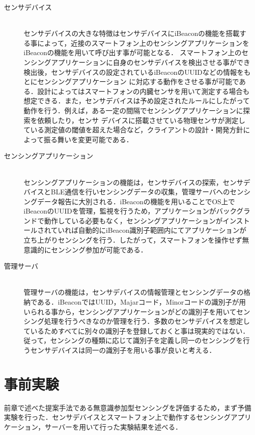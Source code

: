 \documentclass[submit,techrep]{ipsj}
\begin{document}
\begin{description}
 \item[センサデバイス]\mbox{}\\
      センサデバイスの大きな特徴はセンサデバイスにiBeaconの機能を搭載する事によって，近接のスマートフォン上のセンシングアプリケーションをiBeaconの機能を用いて呼び出す事が可能となる．
      スマートフォン上のセンシングアプリケーションに自身のセンサデバイスを検出させる事ができ検出後，センサデバイスの設定されているiBeaconのUUIDなどの情報をもとにセンシングアプリケーション
      に対応する動作をさせる事が可能である．設計によってはスマートフォンの内臓センサを用いて測定する場合も想定できる．また，センサデバイスは予め設定されたルールにしたがって動作を行う．例えば，ある一定の間隔でセンシングアプリケーションに探索を依頼したり，センサ
            デバイスに搭載させている物理センサが測定している測定値の閾値を超えた場合など，クライアントの設計・開発方針によって振る舞いを変更可能である．\\%
 \item[センシングアプリケーション]\mbox{}\\
      センシングアプリケーションの機能は，センサデバイスの探索，センサデバイスとBLE通信を行いセンシングデータの収集，管理サーバへのセンシングデータ報告に大別される．iBeaconの機能を用いることでOS上でiBeaconのUUIDを管理，監視を行うため，アプリケーションがバックグランドで動作している必要もなく，センシングアプリケーションがインストールされていれば自動的にiBeacon識別子範囲内にてアプリケーションが立ち上がりセンシングを行う．したがって，スマートフォンを操作せず無意識的にセンシング参加が可能である．\\
 \item[管理サーバ]\mbox{}\\
      管理サーバの機能は，センサデバイスの情報管理とセンシングデータの格納である．iBeaconではUUID，Majarコード，Minorコードの識別子が用いられる事から，センシングアプリケーションがどの識別子を用いてセンシング処理を行うべきなのか管理を行う．多数のセンサデバイスを想定しているためすべてに別々の識別子を登録しておくと事は現実的ではない．従って，センシングの種類に応じて識別子を定義し同一のセンシングを行うセンサデバイスは同一の識別子を用いる事が良いと考える．
\end{description}

\section{事前実験}
前章で述べた提案手法である無意識参加型センシングを評価するため，まず予備実験を行った．センサデバイスとスマートフォン上で動作するセンシングアプリケーション，サーバーを用いて行った実験結果を述べる．
\end{document}
